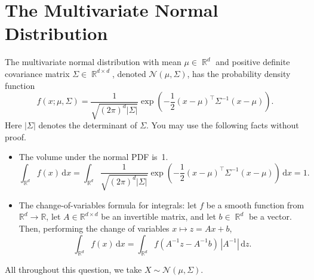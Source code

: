 \documentclass{article}
\newcommand{\Question}[1]{\Large \section{ #1 } \normalsize}
\DeclareMathOperator{\R}{\mathbb{R}}
\begin{document}
\newpage
\Question{The Multivariate Normal Distribution}

The multivariate normal distribution with mean $\mu \in \R^d$ and positive definite covariance matrix $\Sigma \in \R^{d\times d}$, denoted $\mathcal{N}(\mu, \Sigma)$, has the probability density function
\[
    f(x; \mu, \Sigma) = \frac{1}{\sqrt{(2\pi)^d|\Sigma|}} \exp\left(-\frac{1}{2} (x - \mu)^\top \Sigma^{-1} (x - \mu)\right).
\]
Here $|\Sigma|$ denotes the determinant of $\Sigma$. 
You may use the following facts without proof.
\begin{itemize}
    \item 
    The volume under the normal PDF is~1.
    \[
        \int_{\R^d} f(x)\,\mathrm dx = \int_{\R^d} \frac{1}{\sqrt{(2\pi)^d|\Sigma|}} \exp\left(-\frac{1}{2} (x - \mu)^\top \Sigma^{-1} (x - \mu)\right)\,\mathrm dx = 1.
    \]
    \item 
    The change-of-variables formula for integrals: let $f$ be a smooth function from $\mathbb R^d \to \mathbb R$,  let $A\in\mathbb R^{d \times d}$ be an invertible matrix, and let $b \in \R^d$ be a vector. 
    Then, performing the change of variables $x \mapsto z = Ax + b$,  
    \[
        \int_{\R^d} f(x)\, \mathrm dx = \int_{\R^d} f(A^{-1}z - A^{-1}b)\, |A^{-1}| \,\mathrm dz.
    \]
\end{itemize}
All throughout this question, we take $X \sim \mathcal{N}(\mu, \Sigma)$.
\end{document}
